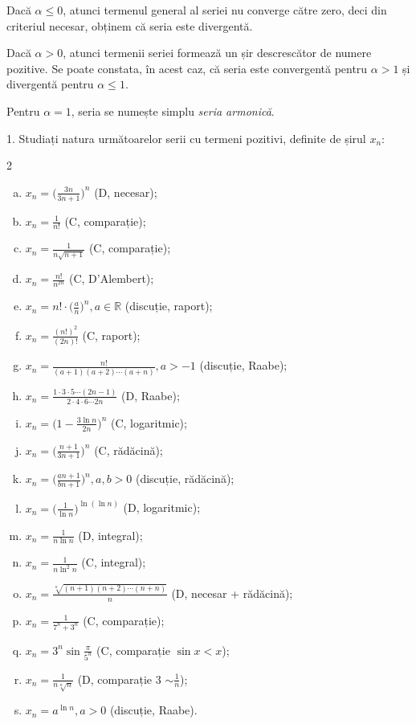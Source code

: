 \documentclass[11pt,a4paper]{article}
\newcommand\RR{\mathbb{R}}
\theoremstyle{dotless}
\theoremstyle{dotlessdr}
\begin{document}
Dacă $\alpha \leq 0$, atunci termenul general al seriei nu converge către zero, deci din
criteriul necesar, obținem că seria este divergentă.

Dacă $\alpha > 0$, atunci termenii seriei formează un șir descrescător de numere pozitive.
Se poate constata, în acest caz, că seria este convergentă pentru $\alpha > 1$ și divergentă
pentru $\alpha \leq 1$.

Pentru $\alpha = 1$, seria se numește simplu \emph{seria armonică}.

\vspace{1cm}

1. Studiați natura următoarelor serii cu termeni pozitivi, definite de șirul $x_n$:
\begin{multicols}{2}
  \begin{enumerate}[(a)]
    \item $x_n = \Big( \frac{3n}{3n + 1} \Big)^n$ (D, necesar);
    \item $x_n = \frac{1}{n!}$ (C, comparație);
    \item $x_n = \frac{1}{n \sqrt{n + 1}}$ (C, comparație);
    \item $x_n = \frac{n!}{n^{2n}}$ (C, D'Alembert);
    \item $x_n = n! \cdot \Big( \frac{a}{n} \Big)^n, a \in \RR$ (discuție, raport);
    \item $x_n = \frac{(n!)^2}{(2n)!}$ (C, raport);
    \item $x_n = \frac{n!}{(a + 1)(a + 2) \cdots (a + n)}, a > -1$ (discuție, Raabe);
    \item $x_n = \frac{1 \cdot 3 \cdot 5 \cdots (2n - 1)}{2 \cdot 4 \cdot 6 \cdots 2n}$ (D, Raabe);
    \item $x_n = \Big( 1 - \frac{3 \ln n}{2n} \Big)^n$ (C, logaritmic);
    \item $x_n = \Big( \frac{n + 1}{3n + 1} \Big)^n$ (C, rădăcină);
    \item $x_n = \Big( \frac{an + 1}{bn + 1} \Big)^n, a, b > 0$ (discuție, rădăcină);
    \item $x_n = \Big( \frac{1}{\ln n} \Big)^{\ln(\ln n)}$ (D, logaritmic);
    \item $x_n = \frac{1}{n \ln n}$ (D, integral);
    \item $x_n = \frac{1}{n \ln^2 n}$ (C, integral);
    \item $x_n = \frac{\sqrt[n]{(n + 1) (n+2) \cdots (n + n)}}{n}$ (D, necesar + rădăcină);
    \item $x_n = \frac{1}{7^n + 3^n}$ (C, comparație);
    \item $x_n = 3^n \sin \frac{\pi}{5^n}$ (C, comparație $\sin x < x$);
    \item $x_n = \frac{1}{n \sqrt[n]{n}}$ (D, comparație 3 $\sim \frac{1}{n}$);
    \item $x_n = a^{\ln n}, a > 0$ (discuție, Raabe).
  \end{enumerate}
\end{multicols}
\end{document}
